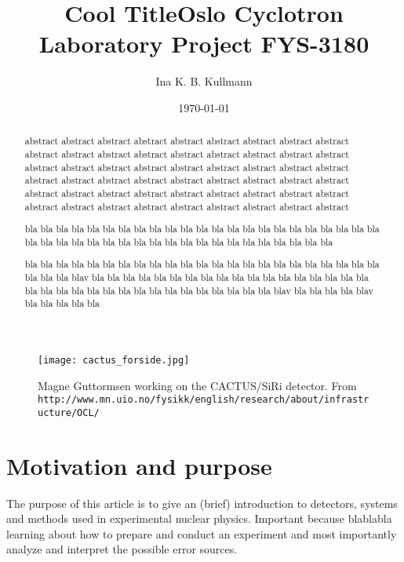 \documentclass[11pt,a4wide]{article}
\title{{\Huge {\bf Cool Title}}\linebreak \linebreak Oslo Cyclotron Laboratory \linebreak \small{Project FYS-3180}}
\author{Ina K. B. Kullmann}
\date{\today}
\begin{document}
\maketitle

\begin{figure}[htp]
\centering
\texttt{[image: cactus\_forside.jpg]}
\caption{Magne Guttormsen working on the CACTUS/SiRi detector. From \texttt{http://www.mn.uio.no/fysikk/english/research/about/infrastructure/OCL/} }
\label{fig:front_page}
\end{figure}

\newpage


\tableofcontents
\newpage

\begin{abstract}
abstract abstract abstract abstract abstract abstract abstract abstract abstract abstract abstract abstract abstract abstract abstract abstract abstract abstract abstract abstract abstract abstract abstract abstract abstract abstract abstract abstract abstract abstract abstract abstract abstract abstract abstract abstract abstract abstract abstract abstract abstract abstract abstract abstract abstract abstract abstract abstract abstract abstract abstract abstract abstract abstract 

bla bla bla bla bla bla bla bla bla bla bla bla bla bla bla bla bla bla bla bla bla bla bla bla bla bla bla bla bla bla bla bla bla bla bla bla bla bla bla bla bla bla bla 

bla bla bla bla bla bla bla bla bla bla bla bla bla bla bla bla bla bla bla bla bla bla bla bla bla bla blav bla bla bla bla bla bla bla bla bla bla bla bla bla bla bla bla bla bla bla bla bla bla bla bla bla bla bla bla bla bla bla bla bla bla blav bla bla bla bla blav bla bla bla bla bla
\end{abstract}


\section{Motivation and purpose}
The purpose of this article is to give an (brief) introduction to detectors, systems and methods used in experimental nuclear physics. Important because blablabla learning about how to prepare and conduct an experiment and most importantly analyze and interpret the possible error sources.
\end{document}
